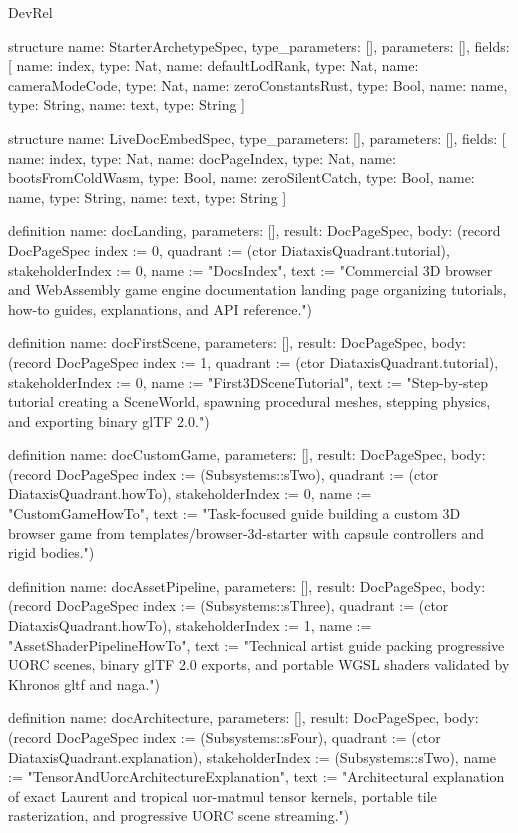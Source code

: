 \begin{lexlean}{DevRel}
\begin{semanticmodule}
structure{
  name: StarterArchetypeSpec,
  type_parameters: [],
  parameters: [],
  fields: [
    {name: index, type: Nat},
    {name: defaultLodRank, type: Nat},
    {name: cameraModeCode, type: Nat},
    {name: zeroConstantsRust, type: Bool},
    {name: name, type: String},
    {name: text, type: String}
  ]
}

structure{
  name: LiveDocEmbedSpec,
  type_parameters: [],
  parameters: [],
  fields: [
    {name: index, type: Nat},
    {name: docPageIndex, type: Nat},
    {name: bootsFromColdWasm, type: Bool},
    {name: zeroSilentCatch, type: Bool},
    {name: name, type: String},
    {name: text, type: String}
  ]
}

definition{
  name: docLanding,
  parameters: [],
  result: DocPageSpec,
  body: (record DocPageSpec {index := 0, quadrant := (ctor DiataxisQuadrant.tutorial), stakeholderIndex := 0, name := "DocsIndex", text := "Commercial 3D browser and WebAssembly game engine documentation landing page organizing tutorials, how-to guides, explanations, and API reference."})
}

definition{
  name: docFirstScene,
  parameters: [],
  result: DocPageSpec,
  body: (record DocPageSpec {index := 1, quadrant := (ctor DiataxisQuadrant.tutorial), stakeholderIndex := 0, name := "First3DSceneTutorial", text := "Step-by-step tutorial creating a SceneWorld, spawning procedural meshes, stepping physics, and exporting binary glTF 2.0."})
}

definition{
  name: docCustomGame,
  parameters: [],
  result: DocPageSpec,
  body: (record DocPageSpec {index := (Subsystems::sTwo), quadrant := (ctor DiataxisQuadrant.howTo), stakeholderIndex := 0, name := "CustomGameHowTo", text := "Task-focused guide building a custom 3D browser game from templates/browser-3d-starter with capsule controllers and rigid bodies."})
}

definition{
  name: docAssetPipeline,
  parameters: [],
  result: DocPageSpec,
  body: (record DocPageSpec {index := (Subsystems::sThree), quadrant := (ctor DiataxisQuadrant.howTo), stakeholderIndex := 1, name := "AssetShaderPipelineHowTo", text := "Technical artist guide packing progressive UORC scenes, binary glTF 2.0 exports, and portable WGSL shaders validated by Khronos gltf and naga."})
}

definition{
  name: docArchitecture,
  parameters: [],
  result: DocPageSpec,
  body: (record DocPageSpec {index := (Subsystems::sFour), quadrant := (ctor DiataxisQuadrant.explanation), stakeholderIndex := (Subsystems::sTwo), name := "TensorAndUorcArchitectureExplanation", text := "Architectural explanation of exact Laurent and tropical uor-matmul tensor kernels, portable tile rasterization, and progressive UORC scene streaming."})
}


\end{semanticmodule}
\end{lexlean}
